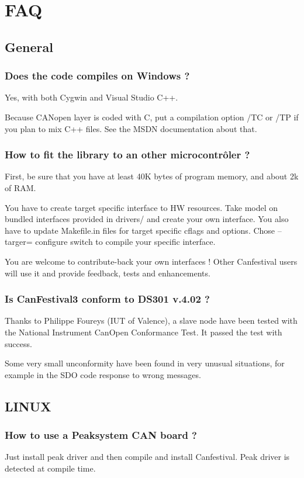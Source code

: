 \documentclass[12pt,twoside]{article}
\begin{document}
\section{FAQ}
\subsection{General}
\subsubsection{Does the code compiles on Windows ?}
Yes, with both Cygwin and Visual Studio C++.

Because CANopen layer is coded with C, put a compilation option /TC or
/TP if you plan to mix C++ files. See the MSDN documentation about
that.

\subsubsection{How to fit the library to an other microcontr\^oler ?}
First, be sure that you have at least 40K bytes of program memory, and
about 2k of RAM. 

You have to create target specific interface to HW resources. Take model
on bundled interfaces provided in drivers/ and create your own
interface. You also have to update Makefile.in files for target
specific cflags and options. Chose {--}targer= configure switch to
compile your specific interface.

You are welcome to contribute{}-back your own interfaces ! Other
Canfestival users will use it and provide feedback, tests and
enhancements.

\subsubsection{Is CanFestival3 conform to DS301 v.4.02 ?}
Thanks to Philippe Foureys (IUT of Valence), a slave node have been
tested with the National Instrument CanOpen Conformance Test. It passed
the test with success.

Some very small unconformity have been found in very unusual situations,
for example in the SDO code response to wrong messages.

\subsection{LINUX}
\subsubsection{How to use a Peaksystem CAN board ?}
Just install peak driver and then compile and install Canfestival. Peak
driver is detected at compile time.
\end{document}
